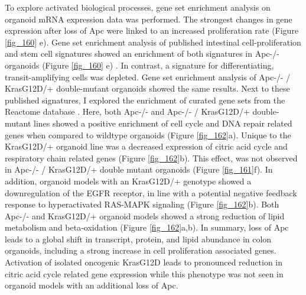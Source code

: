 \begin{flushleft}
To explore activated biological processes, gene set enrichment analysis on organoid mRNA expression data was performed. The strongest changes in gene expression after loss of Apc were linked to an increased proliferation rate (Figure \ref{fig_160} e). Gene set enrichment analysis of published intestinal cell-proliferation and stem cell signatures showed an enrichment of both signatures in Apc-/- organoids (Figure \ref{fig_160} e) \cite{Merlos-Suarez2011-gd}. In contrast, a signature for differentiating, transit-amplifying cells was depleted. Gene set enrichment analysis of Apc-/- / KrasG12D/+ double-mutant organoids showed the same results. Next to these published signatures, I explored the enrichment of curated gene sets from the Reactome database \cite{Griss2020-qi}. Here, both Apc-/- and Apc-/- / KrasG12D/+ double-mutant lines showed a positive enrichment of cell cycle and DNA repair related genes when compared to wildtype organoids (Figure \ref{fig_162}a). Unique to the KrasG12D/+ organoid line was a decreased expression of citric acid cycle and respiratory chain related genes (Figure \ref{fig_162}b). This effect, was not observed in Apc-/- / KrasG12D/+ double mutant organoids (Figure \ref{fig_161}f). In addition, organoid models with an KrasG12D/+ genotype showed a downregulation of the EGFR receptor, in line with a potential negative feedback response to hyperactivated RAS-MAPK signaling (Figure \ref{fig_162}b). Both Apc-/- and KrasG12D/+ organoid models showed a strong reduction of lipid metabolism and beta-oxidation (Figure \ref{fig_162}a,b). In summary, loss of Apc leads to a global shift in transcript, protein, and lipid abundance in colon organoids, including a strong increase in cell proliferation associated genes. Activation of isolated oncogenic KrasG12D leads to pronounced reduction in citric acid cycle related gene expression while this phenotype was not seen in organoid models with an additional loss of Apc.


\end{flushleft}
